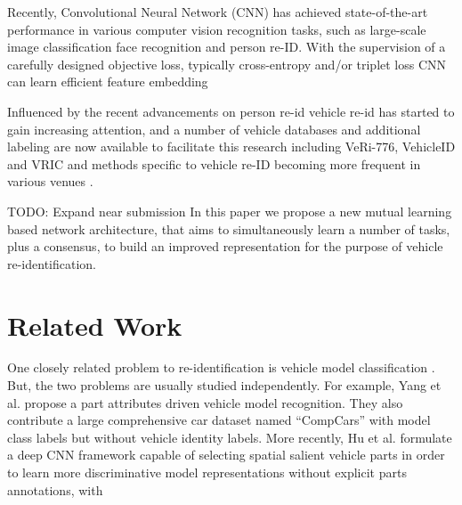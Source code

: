 \documentclass[10pt,twocolumn,letterpaper]{article}
\newcommand{\todo}[1]{}
\renewcommand{\todo}[1]{{\color{red} TODO: {#1}}}
\begin{document}
Recently, Convolutional Neural Network (CNN) has achieved state-of-the-art
performance in various computer vision
recognition tasks, such as large-scale image classification
face recognition  and person re-ID.
With the supervision of a carefully designed objective loss, typically
cross-entropy and/or triplet loss
CNN can learn efficient feature embedding

Influenced by the recent advancements on person re-id vehicle re-id has started
to gain increasing attention,
and a number of vehicle databases and additional labeling are now available to
facilitate this research
 including
 VeRi-776\cite{Liu2016icme-veri, Liu2016eccv_veri},
 VehicleID\cite{liu2016vehicleid} and VRIC\cite{kanaci2018vehicle} and methods
 specific to vehicle re-ID becoming more frequent in various venues
 \cite{wang2017orientation, Shen_2017_ICCV, Zhou2018VAMI}.

\todo{Expand near submission}
In this paper we propose a new mutual learning based network architecture, that
aims to simultaneously learn a number of tasks, plus a consensus, to build an
improved representation for the purpose of vehicle re-identification.

\section{Related Work}

One closely related problem to re-identification is vehicle model
classification
\cite{liao2015exploiting,gu2013car,lin2014jointly,yang2015compcars,sochor2016boxcars,hu2017deep}.
But, the two problems are usually studied independently.
For example, Yang et al. \cite{yang2015compcars} propose a part attributes driven
vehicle model recognition.
They also contribute a large comprehensive car dataset named ``CompCars''
with model class labels but without vehicle identity labels.
More recently, Hu et al. \cite{hu2017deep} formulate a deep CNN framework capable of
selecting spatial salient vehicle parts in order to learn more
discriminative model representations without explicit parts annotations, with
\end{document}
